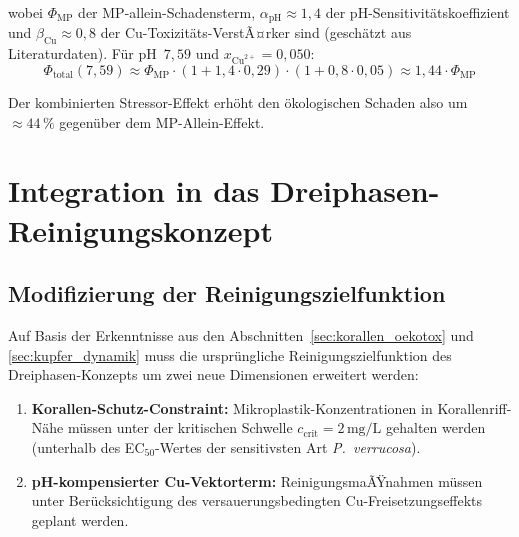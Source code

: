 ﻿\documentclass[12pt,a4paper]{article}
\theoremstyle{definition}
\theoremstyle{remark}
\begin{document}
wobei $\Phi_{\text{MP}}$ der MP-allein-Schadensterm, $\alpha_{\text{pH}} \approx 1{,}4$
der pH-Sensitivit\"atskoeffizient und $\beta_{\text{Cu}} \approx 0{,}8$ der
Cu-Toxizit\"ats-VerstÃ¤rker sind (gesch\"atzt aus Literaturdaten).
F\"ur pH~$7{,}59$ und $x_{\text{Cu}^{2+}} = 0{,}050$:
\begin{equation}
  \Phi_{\text{total}}(7{,}59) \approx \Phi_{\text{MP}} \cdot
  (1 + 1{,}4 \cdot 0{,}29) \cdot (1 + 0{,}8 \cdot 0{,}05)
  \approx 1{,}44 \cdot \Phi_{\text{MP}}
\end{equation}

Der kombinierten Stressor-Effekt erh\"oht den \"okologischen Schaden also um
$\approx 44\,\%$ gegen\"uber dem MP-Allein-Effekt.

\section{Integration in das Dreiphasen-Reinigungskonzept}
\label{sec:integration_dreiphasen}

\subsection{Modifizierung der Reinigungszielfunktion}
\label{subsec:zielfunktion}

Auf Basis der Erkenntnisse aus den Abschnitten~\ref{sec:korallen_oekotox} und
\ref{sec:kupfer_dynamik} muss die urspr\"ungliche Reinigungszielfunktion des
Dreiphasen-Konzepts um zwei neue Dimensionen erweitert werden:

\begin{enumerate}[leftmargin=*]
  \item \textbf{Korallen-Schutz-Constraint:} Mikroplastik-Konzentrationen in
    Korallenriff-N\"ahe m\"ussen unter der kritischen Schwelle
    $c_{\text{crit}} = 2\,\text{mg/L}$ gehalten werden (unterhalb des
    EC$_{50}$-Wertes der sensitivsten Art \textit{P.~verrucosa}).
  \item \textbf{pH-kompensierter Cu-Vektorterm:} ReinigungsmaÃŸnahmen m\"ussen
    unter Ber\"ucksichtigung des versauerungsbedingten Cu-Freisetzungseffekts
    geplant werden.
\end{enumerate}
\end{document}
